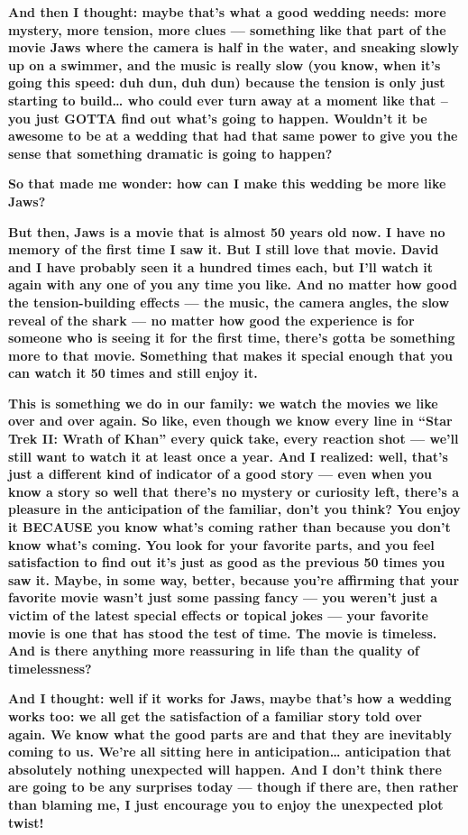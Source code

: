 \textbf{And then I thought: maybe that's what a good wedding needs: more
mystery, more tension, more clues --- something like that part of the
movie Jaws where the camera is half in the water, and sneaking slowly up
on a swimmer, and the music is really slow (you know, when it's going
this speed: duh dun, duh dun) because the tension is only just starting
to build\ldots{} who could ever turn away at a moment like that -- you
just GOTTA find out what's going to happen. Wouldn't it be awesome to be
at a wedding that had that same power to give you the sense that
something dramatic is going to happen?}

\textbf{So that made me wonder: how can I make this wedding be more like
Jaws?}

\textbf{But then, Jaws is a movie that is almost 50 years old now. I
have no memory of the first time I saw it. But I still love that movie.
David and I have probably seen it a hundred times each, but I'll watch
it again with any one of you any time you like. And no matter how good
the tension-building effects --- the music, the camera angles, the slow
reveal of the shark --- no matter how good the experience is for someone
who is seeing it for the first time, there's gotta be something more to
that movie. Something that makes it special enough that you can watch it
50 times and still enjoy it.}

\textbf{This is something we do in our family: we watch the movies we
like over and over again. So like, even though we know every line in
``Star Trek II: Wrath of Khan'' every quick take, every reaction shot
--- we'll still want to watch it at least once a year. And I realized:
well, that's just a different kind of indicator of a good story --- even
when you know a story so well that there's no mystery or curiosity left,
there's a pleasure in the anticipation of the familiar, don't you think?
You enjoy it BECAUSE you know what's coming rather than because you
don't know what's coming. You look for your favorite parts, and you feel
satisfaction to find out it's just as good as the previous 50 times you
saw it. Maybe, in some way, better, because you're affirming that your
favorite movie wasn't just some passing fancy --- you weren't just a
victim of the latest special effects or topical jokes --- your favorite
movie is one that has stood the test of time. The movie is timeless. And
is there anything more reassuring in life than the quality of
timelessness?}

\textbf{And I thought: well if it works for Jaws, maybe that's how a
wedding works too: we all get the satisfaction of a familiar story told
over again. We know what the good parts are and that they are inevitably
coming to us. We're all sitting here in anticipation\ldots{}
anticipation that absolutely nothing unexpected will happen. And I don't
think there are going to be any surprises today --- though if there are,
then rather than blaming me, I just encourage you to enjoy the
unexpected plot twist!}

